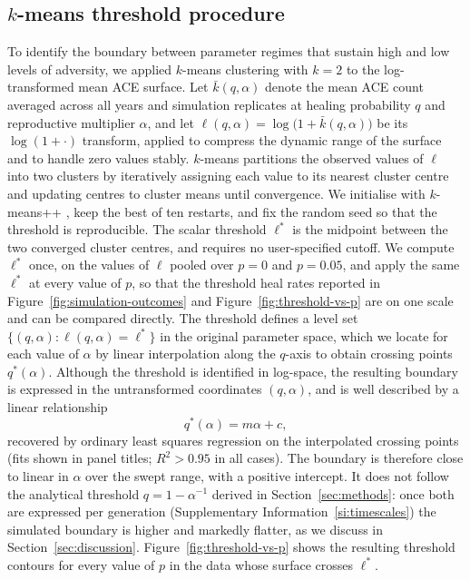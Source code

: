 \documentclass{article}
\begin{document}
\subsection{\(k\)-means threshold procedure}
\label{si:kmeans}

To identify the boundary between parameter regimes that sustain high and low
levels of adversity, we applied \(k\)-means clustering with \(k = 2\)
\cite{lloyd1982least} to the log-transformed mean ACE surface.
Let \(\bar{k}(q, \alpha)\) denote the mean ACE count averaged across all years
and simulation replicates at healing probability \(q\) and reproductive
multiplier \(\alpha\), and let
\(\ell(q, \alpha) = \log\bigl(1 + \bar{k}(q, \alpha)\bigr)\)
be its \(\log(1 + \cdot)\) transform, applied to compress the dynamic range
of the surface and to handle zero values stably.
\(k\)-means partitions the observed values of \(\ell\) into two clusters by
iteratively assigning each value to its nearest cluster centre and updating
centres to cluster means until convergence. We initialise with \(k\)-means++
\cite{arthur2007kmeans}, keep the best of ten restarts, and fix the random seed so
that the threshold is reproducible. The scalar threshold \(\ell^*\) is the midpoint
between the two converged cluster centres, and requires no user-specified cutoff.
We compute \(\ell^*\) once, on the values of \(\ell\) pooled over \(p = 0\) and
\(p = 0.05\), and apply the same \(\ell^*\) at every value of \(p\), so that the
threshold heal rates reported in Figure~\ref{fig:simulation-outcomes} and
Figure~\ref{fig:threshold-vs-p} are on one scale and can be compared directly.
The threshold defines a level set
\(\{(q, \alpha) : \ell(q, \alpha) = \ell^*\}\)
in the original parameter space, which we locate for each value of \(\alpha\)
by linear interpolation along the \(q\)-axis to obtain crossing points
\(q^*(\alpha)\).
Although the threshold is identified in log-space, the resulting boundary is
expressed in the untransformed coordinates \((q, \alpha)\), and is well
described by a linear relationship
\[
    q^*(\alpha) = m\alpha + c,
\]
recovered by ordinary least squares regression on the interpolated crossing
points (fits shown in panel titles; \(R^2 > 0.95\) in all cases).
The boundary is therefore close to linear in \(\alpha\) over the swept range,
with a positive intercept.  It does not follow the analytical threshold
\(q = 1 - \alpha^{-1}\) derived in Section~\ref{sec:methods}: once both are
expressed per generation (Supplementary Information~\ref{si:timescales}) the
simulated boundary is higher and markedly flatter, as we discuss in
Section~\ref{sec:discussion}.
Figure~\ref{fig:threshold-vs-p} shows the resulting threshold contours for
every value of \(p\) in the data whose surface crosses \(\ell^*\).
\end{document}
